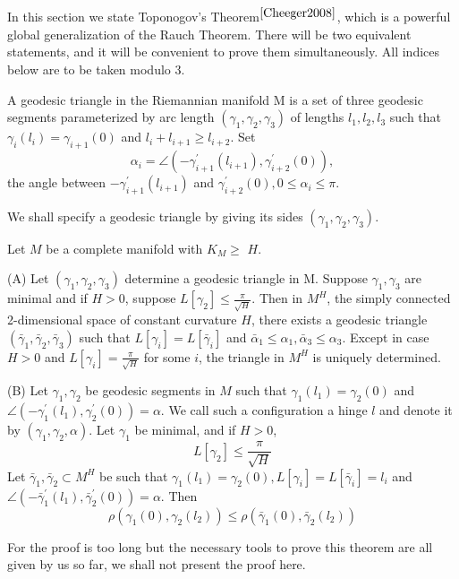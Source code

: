 \documentclass{ctexart}
\begin{document}
In this section we state Toponogov's Theorem$^{\cite{Cheeger2008}}$, which is a powerful global generalization of the Rauch Theorem. There will be two equivalent statements, and it will be convenient to prove them simultaneously.
All indices below are to be taken modulo 3. 
\begin{definition}
  A geodesic triangle in the Riemannian manifold $\mathrm{M}$ is a set of three geodesic segments parameterized by arc length $\left(\gamma_1, \gamma_2, \gamma_3\right)$ of lengths $l_1, l_2, l_3$ such that $\gamma_i\left(l_i\right)=\gamma_{i+1}(0)$ and $l_i+l_{i+1} \geq l_{i+2}$. Set
  $$
  \alpha_i=\angle\left(-\gamma_{i+1}^{\prime}\left(l_{i+1}\right), \gamma_{i+2}^{\prime}(0)\right),
  $$
  the angle between $-\gamma_{i+1}^{\prime}\left(l_{i+1}\right)$ and $\gamma_{i+2}^{\prime}(0), 0 \leq \alpha_i \leq \pi$.  
\end{definition}
We shall specify a geodesic triangle by giving its sides $\left(\gamma_1, \gamma_2, \gamma_3\right)$.
\begin{theorem}
  Let $M$ be a complete manifold with $K_M \geq$ $H$.

  (A) Let $\left(\gamma_1, \gamma_2, \gamma_3\right)$ determine a geodesic triangle in M. Suppose $\gamma_1, \gamma_3$ are minimal and if $H>0$, suppose $L\left[\gamma_2\right] \leq \frac{\pi}{\sqrt{H}}$. 
  Then in $M^H$, the simply connected 2-dimensional space of constant curvature $H$, there exists a geodesic triangle $\left(\bar{\gamma}_1, \bar{\gamma}_2, \bar{\gamma}_3\right)$ 
  such that $L\left[\gamma_i\right]=L\left[\bar{\gamma}_i\right]$ and $\bar{\alpha}_1 \leq \alpha_1, \bar{\alpha}_3 \leq \alpha_3$. 
  Except in case $H>0$ and $L\left[\gamma_i\right]=\frac{\pi}{\sqrt{H}}$ for some $i$, the triangle in $M^H$ is uniquely determined.

  (B) Let $\gamma_1, \gamma_2$ be geodesic segments in $M$ such that $\gamma_1\left(l_1\right)=\gamma_2(0)$ and $\angle\left(-\gamma_1^{\prime}\left(l_1\right), \gamma_2^{\prime}(0)\right)=\alpha$. 
  We call such a configuration a hinge $l$ and denote it by $\left(\gamma_1, \gamma_2, \alpha\right)$. Let $\gamma_1$ be minimal, and if $H>0$,
  $$
  L\left[\gamma_2\right] \leq \frac{\pi}{\sqrt{H}}
  $$
  Let $\bar{\gamma}_1, \bar{\gamma}_2 \subset M^H$ be such that $\gamma_1\left(l_1\right)=\gamma_2(0), L\left[\gamma_i\right]=L\left[\bar{\gamma}_i\right]=l_i$ and 
  $\angle\left(-\bar{\gamma}_1^{\prime}\left(l_1\right), \bar{\gamma}_2^{\prime}(0)\right)=\alpha$. Then
  $$
  \rho\left(\gamma_1(0), \gamma_2\left(l_2\right)\right) \leq \rho\left(\bar{\gamma}_1(0), \bar{\gamma}_2\left(l_2\right)\right)
  $$  
\end{theorem}
For the proof is too long but the necessary tools to prove this theorem are all given by us so far, we shall not present the proof here. 






\end{document}
